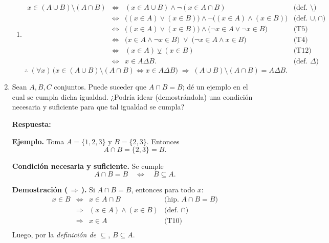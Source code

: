 \documentclass[12pt,letterpaper]{exam}
\begin{document}
\begin{enumerate}
\begin{enumerate}[label=\alph*)]
\item
\[
\begin{array}{rcll}
x\in (A\cup B)\setminus(A\cap B)
&\iff& (x\in A\cup B)\land\neg(x\in A\cap B) & \text{(def.\ $\setminus$)}\\[2pt]
&\iff& \big((x\in A)\lor(x\in B)\big)\land\neg\big((x\in A)\land(x\in B)\big) & \text{(def.\ $\cup,\cap$)}\\[2pt]
&\iff& \big((x\in A)\lor(x\in B)\big)\land\big(\neg x\in A\lor\neg x\in B\big) & \text{(T5)}\\[2pt]
&\iff& \big(x\in A\land\neg x\in B\big)\;\lor\;\big(\neg x\in A\land x\in B\big) & \text{(T4)}\\[2pt]
&\iff& (x\in A)\veebar(x\in B) & \text{(T12)}\\[2pt]
&\iff& x\in A\Delta B. & \text{(def.\ $\Delta$)}
\end{array}
\]
\[
\therefore\; (\forall x)\,\big(x\in (A\cup B)\setminus(A\cap B) \iff x\in A\Delta B\big)
\;\Rightarrow\; (A\cup B)\setminus(A\cap B) = A\Delta B.
\]
\end{enumerate}

    \item Sean $A,B,C$ conjuntos. Puede suceder que $A\cap B = B$; dé un ejemplo en el cual se cumpla  dicha 
    igualdad. ¿Podría idear (demostrándola) una condición necesaria y suficiente para que tal  igualdad se 
    cumpla?
    
    \textbf{Respuesta:}


    \textbf{Ejemplo.} Toma $A=\{1,2,3\}$ y $B=\{2,3\}$. Entonces
    \[
    A\cap B=\{2,3\}=B.
    \]

    \textbf{Condición necesaria y suficiente.} \; Se cumple
    \[
    A\cap B = B \quad\Longleftrightarrow\quad B \subseteq A.
    \]

    \textbf{Demostración (\,$\Rightarrow$\,).} Si $A\cap B = B$, entonces para todo $x$:
    \[
    \begin{array}{rcll}
    x\in B &\iff& x\in A\cap B & \text{(hip.\ $A\cap B=B$)}\\[2pt]
    &\Rightarrow& (x\in A)\land(x\in B) & \text{(def.\ $\cap$)}\\[2pt]
    &\Rightarrow& x\in A & \text{(T10)}\\[2pt]
    \end{array}
    \]
    Luego, por la \emph{definición de} $\subseteq$, $B\subseteq A$.


\end{enumerate}
\end{document}
